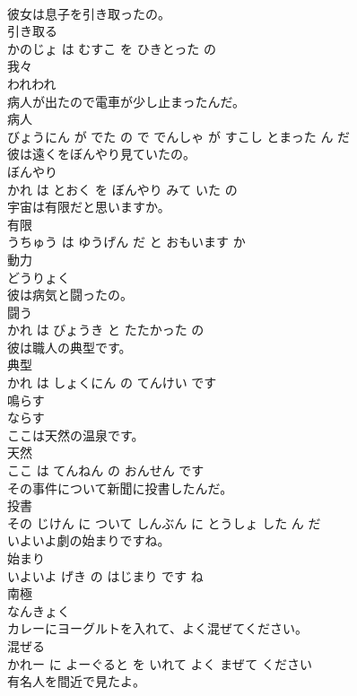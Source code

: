 \documentclass[8pt]{extreport}
\begin{document}
\begin{CJK}{UTF8}{min}
\\	彼女は息子を引き取ったの。	
\\	引き取る 
\\	かのじょ は むすこ を ひきとった の			
\\	我々	
\\	われわれ			
\\	病人が出たので電車が少し止まったんだ。	
\\	病人 
\\	びょうにん が でた の で でんしゃ が すこし とまった ん だ			
\\	彼は遠くをぼんやり見ていたの。	
\\	ぼんやり 
\\	かれ は とおく を ぼんやり みて いた の			
\\	宇宙は有限だと思いますか。	
\\	有限 
\\	うちゅう は ゆうげん だ と おもいます か			
\\	動力	
\\	どうりょく			
\\	彼は病気と闘ったの。	
\\	闘う 
\\	かれ は びょうき と たたかった の			
\\	彼は職人の典型です。	
\\	典型 
\\	かれ は しょくにん の てんけい です			
\\	鳴らす	
\\	ならす			
\\	ここは天然の温泉です。	
\\	天然 
\\	ここ は てんねん の おんせん です			
\\	その事件について新聞に投書したんだ。	
\\	投書 
\\	その じけん に ついて しんぶん に とうしょ した ん だ			
\\	いよいよ劇の始まりですね。	
\\	始まり 
\\	いよいよ げき の はじまり です ね			
\\	南極	
\\	なんきょく			
\\	カレーにヨーグルトを入れて、よく混ぜてください。	
\\	混ぜる 
\\	かれー に よーぐると を いれて よく まぜて ください			
\\	有名人を間近で見たよ。	

\end{CJK}
\end{document}

